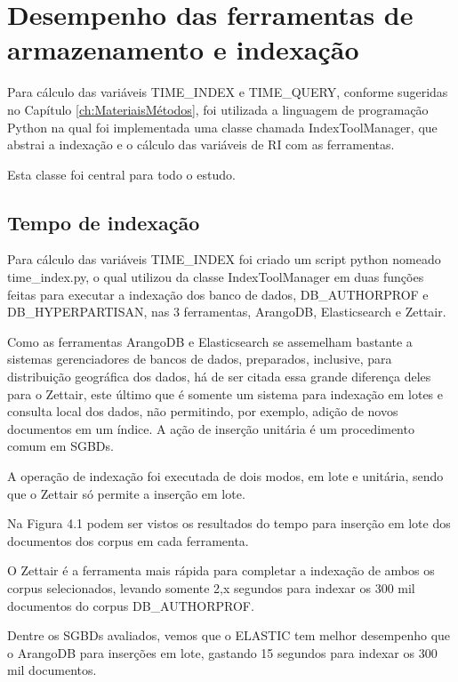 	\section{Desempenho das ferramentas de armazenamento e indexação} \label{sec:resex1}
		Para cálculo das variáveis TIME_INDEX e TIME_QUERY, conforme sugeridas no Capítulo \ref{ch:MateriaisMétodos}, foi utilizada a linguagem de programação Python na qual foi implementada uma classe chamada IndexToolManager, que abstrai a indexação e o cálculo das variáveis de RI com as ferramentas. 

		Esta classe foi central para todo o estudo.

		\subsection{Tempo de indexação}
			Para cálculo das variáveis TIME_INDEX foi criado um script python nomeado time_index.py, o qual utilizou da classe IndexToolManager em duas funções feitas para executar a indexação dos banco de dados, DB_AUTHORPROF e DB_HYPERPARTISAN, nas 3 ferramentas, ArangoDB, Elasticsearch e Zettair. 

			

			Como as ferramentas ArangoDB e Elasticsearch se assemelham bastante a sistemas gerenciadores de bancos de dados, preparados, inclusive, para distribuição geográfica dos dados, há de ser citada essa grande diferença deles para o Zettair, este último que é somente um sistema para indexação em lotes e consulta local dos dados, não permitindo, por exemplo, adição de novos documentos em um índice. A ação de inserção unitária é um procedimento comum em SGBDs. 

			

			A operação de indexação foi executada de dois modos, em lote e unitária, sendo que o Zettair só permite a inserção em lote. 

			

			Na Figura 4.1 podem ser vistos os resultados do tempo para inserção em lote dos documentos dos corpus  em cada ferramenta. 

			

			O Zettair é a ferramenta mais rápida para completar a indexação de ambos os corpus selecionados, levando somente 2,x segundos para indexar os 300 mil documentos do corpus DB_AUTHORPROF. 

			Dentre os SGBDs avaliados, vemos que o ELASTIC tem  melhor desempenho que o ArangoDB para inserções em lote, gastando 15 segundos para indexar os 300 mil documentos. 

